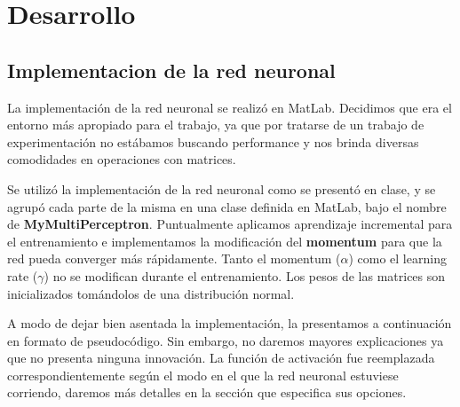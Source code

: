 \documentclass[informe.tex]{subfiles}
\begin{document}
  
  \section{Desarrollo}
  
  \subsection{Implementacion de la red neuronal}
    La implementación de la red neuronal se realizó en MatLab. Decidimos que era el entorno más apropiado para el trabajo, ya que por tratarse de un trabajo de experimentación no estábamos buscando performance y nos brinda diversas comodidades en operaciones con matrices. 
    
    Se utilizó la implementación de la red neuronal como se presentó en clase, y se agrupó cada parte de la misma en una clase definida en MatLab, bajo el nombre de \textbf{MyMultiPerceptron}. Puntualmente aplicamos aprendizaje incremental para el entrenamiento e implementamos la modificación del \textbf{momentum} para que la red pueda converger más rápidamente. Tanto el momentum ($\alpha$) como el learning rate ($\gamma$) no se modifican durante el entrenamiento. Los pesos de las matrices son inicializados tom\'andolos de una distribuci\'on normal.
    
    A modo de dejar bien asentada la implementación, la presentamos a continuación en formato de pseudocódigo. Sin embargo, no daremos mayores explicaciones ya que no presenta ninguna innovación. La función de activación fue reemplazada correspondientemente según el modo en el que la red neuronal estuviese corriendo, daremos más detalles en la sección que especifica sus opciones.
  
    \vspace{15pt}
    
\end{document}
